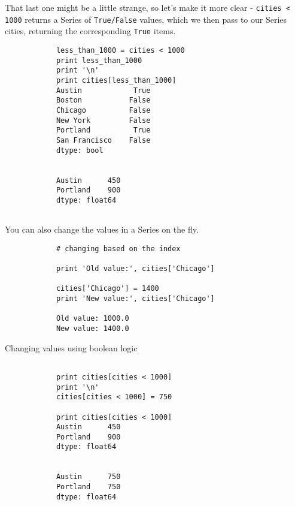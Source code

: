 \documentclass[MASTER.tex]{subfiles}
\begin{document}
	\begin{frame}[fragile]
		
		That last one might be a little strange, so let's make it more clear - \texttt{cities < 1000} returns a Series of \texttt{True/False} values, which we then pass to our Series cities, returning the corresponding \texttt{True} items.
		
	\end{frame}
	\begin{frame}[fragile]
		
		\begin{framed}
			\begin{verbatim}
			less_than_1000 = cities < 1000
			print less_than_1000
			print '\n'
			print cities[less_than_1000]
			Austin            True
			Boston           False
			Chicago          False
			New York         False
			Portland          True
			San Francisco    False
			dtype: bool
			
			
			Austin      450
			Portland    900
			dtype: float64
		
			\end{verbatim}
		\end{framed}
	\end{frame}
	\begin{frame}[fragile]
		
		You can also change the values in a Series on the fly.
		
		\begin{framed}
			\begin{verbatim}
			# changing based on the index

			print 'Old value:', cities['Chicago']

			cities['Chicago'] = 1400
			print 'New value:', cities['Chicago']

			Old value: 1000.0
			New value: 1400.0
			\end{verbatim}
		\end{framed}
\end{frame}
\begin{frame}[fragile]	
Changing values using boolean logic
		\begin{framed}
			\begin{verbatim}

			print cities[cities < 1000]
			print '\n'
			cities[cities < 1000] = 750
			
			print cities[cities < 1000]
			Austin      450
			Portland    900
			dtype: float64
			
			
			Austin      750
			Portland    750
			dtype: float64
			\end{verbatim}
		\end{framed}
	\end{frame}
\end{document}
